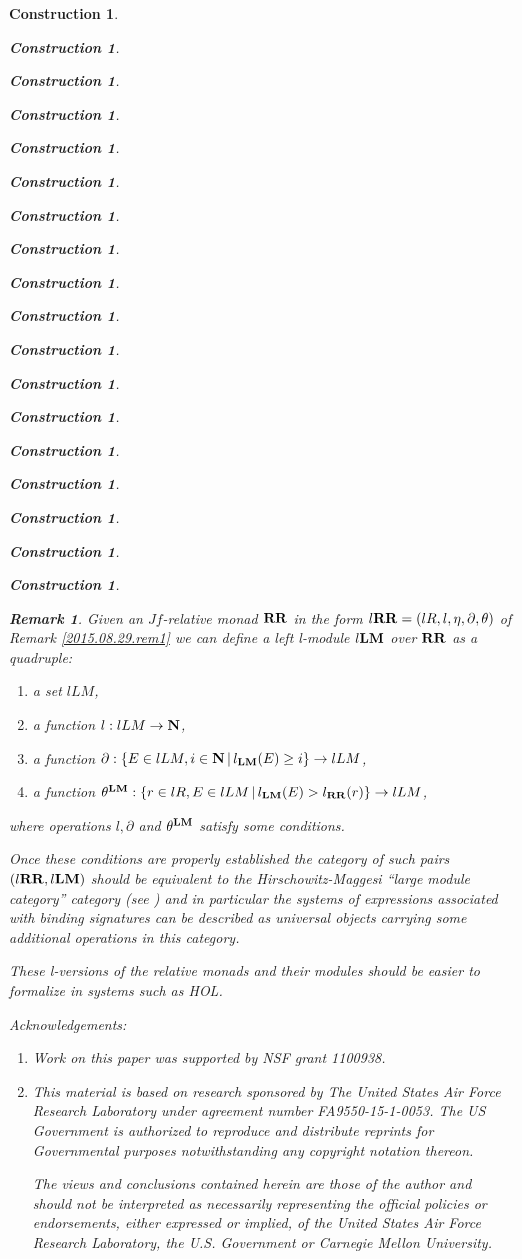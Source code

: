 \documentclass[12pt]{amsart}
\newtheorem{remark}[proposition]{Remark}
\newtheorem{construction}[proposition]{Construction}
\newcommand{\llabel}[1]{\label{#1}}
\newcommand{\sr}{\rightarrow}
\newcommand{\nn}{{\bf N\rm}}
\newcommand{\nat}{\nn}
\newcommand{\RR}{{\bf RR}}
\newcommand{\LM}{{\bf LM}}
\begin{document}
\begin{construction}
\begin{construction}
\begin{construction}
\begin{construction}
\begin{construction}
\begin{construction}
\begin{construction}
\begin{construction}
\begin{construction}
\begin{construction}
\begin{construction}
\begin{construction}
\begin{construction}
\begin{construction}
\begin{construction}
\begin{construction}
\begin{construction}
\begin{construction}
\begin{remark}\rm
\llabel{2015.09.13.rem1} 
Given an $Jf$-relative monad $\RR$ in the form
$l\RR=(lR,l,\eta,\partial,\theta)$ of Remark \ref{2015.08.29.rem1} we can
define a left l-module $l\LM$ over $\RR$ as a quadruple:
%
\begin{enumerate}
\item a set $lLM$,
\item a function $l:lLM\sr \nn$,
\item a function $\partial:\{E\in lLM, i\in\nat\,|\, l_{\LM}(E)\ge i\}\sr lLM$,
\item a function $\theta^{\LM}:\{r\in lR,E\in lLM\,|\,l_{\LM}(E)>l_{\RR}(r)\}\sr lLM$,
%
\end{enumerate}
%
where operations $l,\partial$ and $\theta^{\LM}$ satisfy some conditions. 

Once these conditions are properly established the category of such pairs
$(l\RR,l\LM)$ should be equivalent to the Hirschowitz-Maggesi ``large module
category'' category (see \cite[Definition 2.9]{HM2008}) and in particular the
systems of expressions associated with binding signatures can be described as
universal objects carrying some additional operations in this category.

These l-versions of the relative monads and their modules should be easier to
formalize in systems such as {\em HOL}.
\end{remark} 
%

{\em Acknowledgements:} 
%
\begin{enumerate}
\item Work on this paper was supported by NSF grant 1100938.
\item This material is based on research sponsored by The United States Air
  Force Research Laboratory under agreement number FA9550-15-1-0053. The US
  Government is authorized to reproduce and distribute reprints for
  Governmental purposes notwithstanding any copyright notation thereon.

The views and conclusions contained herein are those of the author and should
not be interpreted as necessarily representing the official policies or
endorsements, either expressed or implied, of the United States Air Force
Research Laboratory, the U.S. Government or Carnegie Mellon University.
\end{enumerate}



\end{construction}
\end{construction}
\end{construction}
\end{construction}
\end{construction}
\end{construction}
\end{construction}
\end{construction}
\end{construction}
\end{construction}
\end{construction}
\end{construction}
\end{construction}
\end{construction}
\end{construction}
\end{construction}
\end{construction}
\end{construction}
\end{document}
